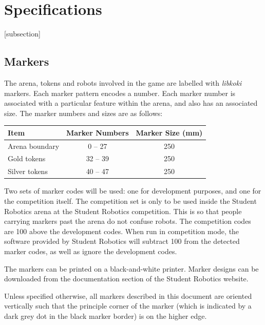 \section{Specifications}
\label{sec:Specifications}

[subsection]
\newcommand{\rcnii}{\stepcounter{rulei}\arabic{section}.\arabic{subsection}.\arabic{rulei}}
\renewcommand{\labelenumi}{\rcnii}

\subsection{Markers}
\label{sub:markers}
The arena, tokens and robots involved in the game are labelled with \textit{libkoki} markers.
Each marker pattern encodes a number.
Each marker number is associated with a particular feature within the arena, and also has an associated size.
The marker numbers and sizes are as follows:

\begin{center}
  \begin{tabular}{lcc}
    \toprule
    \textbf{Item} & \textbf{Marker Numbers} & \textbf{Marker Size (mm)} \\
    \midrule
    Arena boundary & {} 0 -- 27 & 250 \\
    Gold tokens & {} 32 -- 39 & 250 \\
    Silver tokens & {} 40 -- 47 & 250 \\
    \bottomrule
  \end{tabular}
\end{center}

Two sets of marker codes will be used: one for development purposes, and one for the competition itself.
The competition set is only to be used inside the Student Robotics arena at the Student Robotics competition.
This is so that people carrying markers past the arena do not confuse robots.
The competition codes are 100 above the development codes.
When run in competition mode, the software provided by Student Robotics will subtract 100 from the detected marker codes, as well as ignore the development codes.

The markers can be printed on a black-and-white printer.
Marker designs can be downloaded from the documentation section of the Student Robotics website.

Unless specified otherwise, all markers described in this document are oriented vertically such that the principle corner of the marker (which is indicated by a dark grey dot in the black marker border) is on the higher edge.

